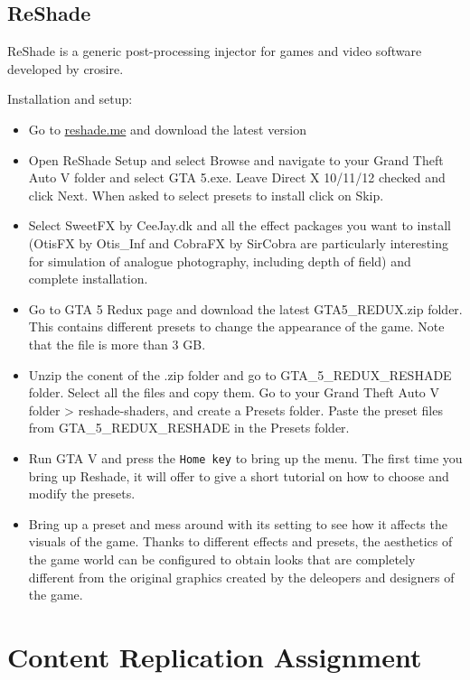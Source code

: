 \documentclass[
  openany]{book}
\begin{document}
\hypertarget{reshade}{%
\subsection*{ReShade}\label{reshade}}

ReShade is a generic post-processing injector for games and video software developed by crosire.

Installation and setup:

\begin{itemize}
\item
  Go to \href{http://static.reshade.me/}{reshade.me} and download the latest version
\item
  Open ReShade Setup and select Browse and navigate to your Grand Theft Auto V folder and select GTA 5.exe. Leave Direct X 10/11/12 checked and click Next. When asked to select presets to install click on Skip.
\item
  Select SweetFX by CeeJay.dk and all the effect packages you want to install (OtisFX by Otis\_Inf and CobraFX by SirCobra are particularly interesting for simulation of analogue photography, including depth of field) and complete installation.
\item
  Go to GTA 5 Redux page and download the latest GTA5\_REDUX.zip folder. This contains different presets to change the appearance of the game. Note that the file is more than 3 GB.
\item
  Unzip the conent of the .zip folder and go to GTA\_5\_REDUX\_RESHADE folder. Select all the files and copy them. Go to your Grand Theft Auto V folder \textgreater{} reshade-shaders, and create a Presets folder. Paste the preset files from GTA\_5\_REDUX\_RESHADE in the Presets folder.
\item
  Run GTA V and press the \texttt{Home\ key} to bring up the menu. The first time you bring up Reshade, it will offer to give a short tutorial on how to choose and modify the presets.
\item
  Bring up a preset and mess around with its setting to see how it affects the visuals of the game. Thanks to different effects and presets, the aesthetics of the game world can be configured to obtain looks that are completely different from the original graphics created by the deleopers and designers of the game.
\end{itemize}

\hypertarget{content-replication-assignment-5}{%
\section*{Content Replication Assignment}\label{content-replication-assignment-5}}
\end{document}
